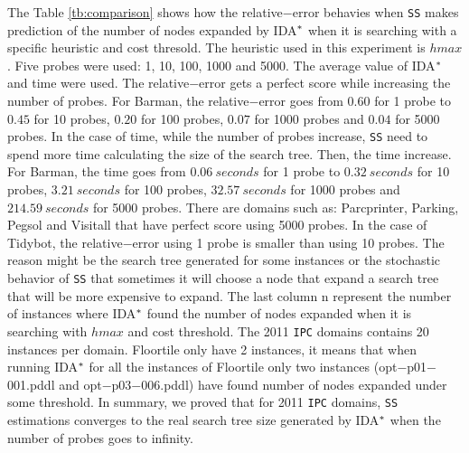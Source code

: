 The Table \ref{tb:comparison} shows how the relative$-$error behavies when \texttt{SS} makes prediction of the number of nodes expanded by IDA$\sp{*}$ when it is searching with a specific heuristic and cost thresold. The heuristic used in this experiment is $hmax$. Five probes were used: 1, 10, 100, 1000 and 5000. The average value of IDA$\sp{*}$ and time were used. The relative$-$error gets a perfect score while increasing the number of probes. For Barman, the relative$-$error goes from $0.60$ for 1 probe to $0.45$ for 10 probes, $0.20$ for 100 probes, $0.07$ for 1000 probes and $0.04$ for 5000 probes. In the case of time, while the number of probes increase, \texttt{SS} need to spend more time calculating the size of the search tree. Then, the time increase. For Barman, the time goes from $0.06\ seconds$ for 1 probe to $0.32\ seconds$ for 10 probes, $3.21\ seconds$ for 100 probes, $32.57\ seconds$ for 1000 probes and $214.59\ seconds$ for 5000 probes. There are domains such as: Parcprinter, Parking, Pegsol and Visitall that have perfect score using 5000 probes. In the case of Tidybot, the relative$-$error using 1 probe is smaller than using 10 probes. The reason might be the search tree generated for some instances or the stochastic behavior of \texttt{SS} that sometimes it will choose a node that expand a search tree that will be more expensive to expand. The last column \textsf{n} represent the number of instances where IDA$\sp{*}$ found the number of nodes expanded when it is searching with $hmax$ and cost threshold. The 2011 \texttt{IPC} domains contains 20 instances per domain. Floortile only have 2 instances, it means that when running IDA$\sp{*}$ for all the instances of Floortile only two instances (opt$-$p01$-$001.pddl and opt$-$p03$-$006.pddl) have found number of nodes expanded under some threshold. In summary, we proved that for 2011 \texttt{IPC} domains, \texttt{SS} estimations converges to the real search tree size generated by IDA$\sp{*}$ when the number of probes goes to infinity.

